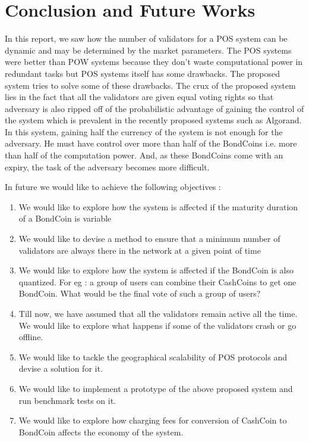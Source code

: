 \section{Conclusion and Future Works}

In this report, we saw how the number of validators for a POS system can be dynamic and may be determined by the market parameters. The POS systems were better than POW systems because they don't waste computational power in redundant tasks but POS systems itself has some drawbacks. The proposed system tries to solve some of these drawbacks. The crux of the proposed system lies in the fact that all the validators are given equal voting rights so that adversary is also ripped off of the probabilistic advantage of gaining the control of the system which is prevalent in the recently proposed systems such as Algorand. In this system, gaining half the currency of the system is not enough for the adversary. He must have control over more than half of the BondCoins i.e. more than half of the computation power. And, as these BondCoins come with an expiry, the task of the adversary becomes more difficult.

In future we would like to achieve the following objectives :
\begin{enumerate}
    \item We would like to explore how the system is affected if the maturity duration of a BondCoin is variable
    \item We would like to devise a method to ensure that a minimum number of validators are always there in the network at a given point of time
    \item We would like to explore how the system is affected if the BondCoin is also quantized. For eg : a group of users can combine their CashCoins to get one BondCoin. What would be the final vote of such a group of users?
    \item Till now, we have assumed that all the validators remain active all the time. We would like to explore what happens if some of the validators crash or go offline.
    \item We would like to tackle the geographical scalability of POS protocols and devise a solution for it.
    \item We would like to implement a prototype of the above proposed system and run benchmark tests on it.
    \item We would like to explore how charging fees for conversion of CashCoin to BondCoin affects the economy of the system.
\end{enumerate}
